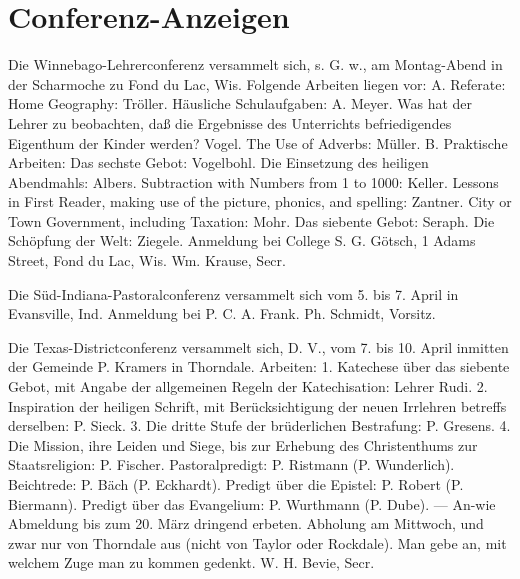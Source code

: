 \chapter{Conferenz-Anzeigen}

Die Winnebago-Lehrerconferenz versammelt sich, s. G. w., am Montag-Abend in der Scharmoche zu Fond du Lac, Wis. Folgende Arbeiten liegen vor: A. Referate: Home Geography: Tröller. Häusliche Schulaufgaben: A. Meyer. Was hat der Lehrer zu beobachten, daß die Ergebnisse des Unterrichts befriedigendes Eigenthum der Kinder werden? Vogel. The Use of Adverbs: Müller. B. Praktische Arbeiten: Das sechste Gebot: Vogelbohl. Die Einsetzung des heiligen Abendmahls: Albers. Subtraction with Numbers from 1 to 1000: Keller. Lessons in First Reader, making use of the picture, phonics, and spelling: Zantner. City or Town Government, including Taxation: Mohr. Das siebente Gebot: Seraph. Die Schöpfung der Welt: Ziegele. Anmeldung bei College S. G. Götsch, 1 Adams Street, Fond du Lac, Wis. Wm. Krause, Secr.

Die Süd-Indiana-Pastoralconferenz versammelt sich vom 5. bis 7. April in Evansville, Ind. Anmeldung bei P. C. A. Frank. Ph. Schmidt, Vorsitz.

Die Texas-Districtconferenz versammelt sich, D. V., vom 7. bis 10. April inmitten der Gemeinde P. Kramers in Thorndale. Arbeiten: 1. Katechese über das siebente Gebot, mit Angabe der allgemeinen Regeln der Katechisation: Lehrer Rudi. 2. Inspiration der heiligen Schrift, mit Berücksichtigung der neuen Irrlehren betreffs derselben: P. Sieck. 3. Die dritte Stufe der brüderlichen Bestrafung: P. Gresens. 4. Die Mission, ihre Leiden und Siege, bis zur Erhebung des Christenthums zur Staatsreligion: P. Fischer. Pastoralpredigt: P. Ristmann (P. Wunderlich). Beichtrede: P. Bäch (P. Eckhardt). Predigt über die Epistel: P. Robert (P. Biermann). Predigt über das Evangelium: P. Wurthmann (P. Dube). — An-wie Abmeldung bis zum 20. März dringend erbeten. Abholung am Mittwoch, und zwar nur von Thorndale aus (nicht von Taylor oder Rockdale). Man gebe an, mit welchem Zuge man zu kommen gedenkt. W. H. Bevie, Secr.
